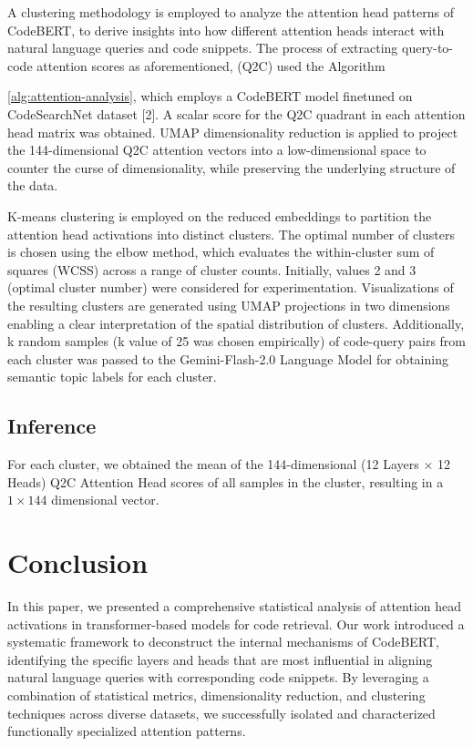 \documentclass[conference]{IEEEtran}
\begin{document}
A clustering methodology is employed  to analyze the attention head patterns of CodeBERT, to derive insights into how different attention heads interact with natural language queries and code snippets. The process of extracting query-to-code attention scores as aforementioned, (Q2C) used the Algorithm {\ref{alg:attention-analysis}, which employs a CodeBERT model finetuned on CodeSearchNet dataset [2]. A scalar score for the Q2C quadrant in each attention head matrix was obtained. UMAP dimensionality reduction is applied to project the 144-dimensional Q2C attention vectors into a low-dimensional space to counter the curse of dimensionality, while preserving the underlying structure of the data. 

K-means clustering is employed on the reduced embeddings to partition the attention head activations into distinct clusters. The optimal number of clusters is chosen using the elbow method, which evaluates the within-cluster sum of squares (WCSS) across a range of cluster counts. Initially, values 2 and 3 (optimal cluster number) were considered for experimentation. Visualizations of the resulting clusters are generated using UMAP projections in two dimensions enabling a clear interpretation of the spatial distribution of clusters. Additionally, k random samples (k value of 25 was chosen empirically) of code-query pairs from each cluster was passed to the Gemini-Flash-2.0 Language Model for obtaining semantic topic labels for each cluster.

\subsection{Inference}
For each cluster, we obtained the mean of the 144-dimensional (12 Layers $\times$ 12 Heads) Q2C Attention Head scores of all samples in the cluster, resulting in a $1 \times 144$ dimensional vector.



\section{Conclusion}
In this paper, we presented a comprehensive statistical analysis of attention head activations in transformer-based models for code retrieval. Our work introduced a systematic framework to deconstruct the internal mechanisms of CodeBERT, identifying the specific layers and heads that are most influential in aligning natural language queries with corresponding code snippets. By leveraging a combination of statistical metrics, dimensionality reduction, and clustering techniques across diverse datasets, we successfully isolated and characterized functionally specialized attention patterns.

}
\end{document}
